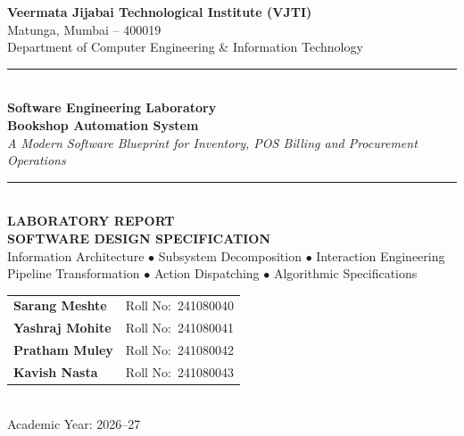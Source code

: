 \documentclass[12pt, a4paper]{report}
\begin{document}
\begin{titlepage}
  \centering
  {\fontsize{16}{20}\selectfont\bfseries
    Veermata Jijabai Technological Institute (VJTI)}\\[0.25cm]
  {\fontsize{12}{15}\selectfont Matunga, Mumbai -- 400019}\\[0.25cm]
  {\fontsize{12}{15}\selectfont
    Department of Computer Engineering \& Information Technology}\\[0.8cm]
  \rule{\textwidth}{1.5pt}\\[0.5cm]
  {\fontsize{13}{16}\selectfont\bfseries Software Engineering Laboratory}\\[0.25cm]
  {\fontsize{20}{24}\selectfont\bfseries\color{vjtiblue} Bookshop Automation System}\\[0.25cm]
  {\fontsize{11}{14}\selectfont\itshape A Modern Software Blueprint for Inventory, POS Billing and Procurement Operations}\\[0.4cm]
  \rule{\textwidth}{1.5pt}\\[0.8cm]
  {\fontsize{14}{16}\selectfont\bfseries LABORATORY REPORT}\\[0.2cm]
  {\fontsize{16}{19}\selectfont\bfseries\color{accentblue} SOFTWARE DESIGN SPECIFICATION}\\[0.3cm]
  {\fontsize{10}{13}\selectfont Information Architecture $\bullet$ Subsystem Decomposition $\bullet$ Interaction Engineering\\
  Pipeline Transformation $\bullet$ Action Dispatching $\bullet$ Algorithmic Specifications}\\[0.8cm]
  
  \begin{tabular}{ll}
    \textbf{Sarang Meshte}  & Roll No:\ 241080040 \\[5pt]
    \textbf{Yashraj Mohite} & Roll No:\ 241080041 \\[5pt]
    \textbf{Pratham Muley}  & Roll No:\ 241080042 \\[5pt]
    \textbf{Kavish Nasta}   & Roll No:\ 241080043 \\
  \end{tabular}\\[0.8cm]
  {\fontsize{11}{14}\selectfont Academic Year: 2026--27}
\end{titlepage}

\tableofcontents
\clearpage

\end{document}
